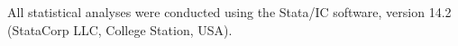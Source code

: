 All statistical analyses were conducted using the Stata/IC software, version 14.2 (StataCorp LLC, College Station, USA).


